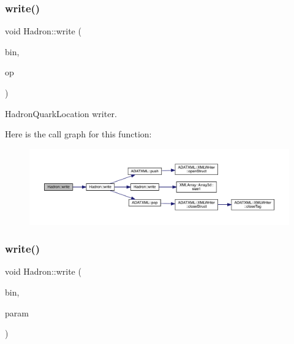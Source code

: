 \subsubsection{\texorpdfstring{write()}{write()}\hspace{0.1cm}{\footnotesize\ttfamily [64/95]}}
{\footnotesize\ttfamily void Hadron\+::write (\begin{DoxyParamCaption}\item[{\mbox{\hyperlink{classADATIO_1_1BinaryWriter}{Binary\+Writer}} \&}]{bin,  }\item[{const \mbox{\hyperlink{structHadron_1_1HadronQuarkLocation__t}{Hadron\+Quark\+Location\+\_\+t}} \&}]{op }\end{DoxyParamCaption})}



Hadron\+Quark\+Location writer. 

Here is the call graph for this function\+:
\nopagebreak
\begin{figure}[H]
\begin{center}
\leavevmode
\includegraphics[width=350pt]{d1/daf/namespaceHadron_a8953a24e53ffe4d60e9c0ba26a48a9e3_cgraph}
\end{center}
\end{figure}
\mbox{\label{namespaceHadron_aee7b5924c79af024abb8c3d99f7e8b34}} 
\subsubsection{\texorpdfstring{write()}{write()}\hspace{0.1cm}{\footnotesize\ttfamily [65/95]}}
{\footnotesize\ttfamily void Hadron\+::write (\begin{DoxyParamCaption}\item[{\mbox{\hyperlink{classADATIO_1_1BinaryWriter}{Binary\+Writer}} \&}]{bin,  }\item[{const \mbox{\hyperlink{structHadron_1_1ValGlueElementalOperator__t}{Val\+Glue\+Elemental\+Operator\+\_\+t}} \&}]{param }\end{DoxyParamCaption})}



